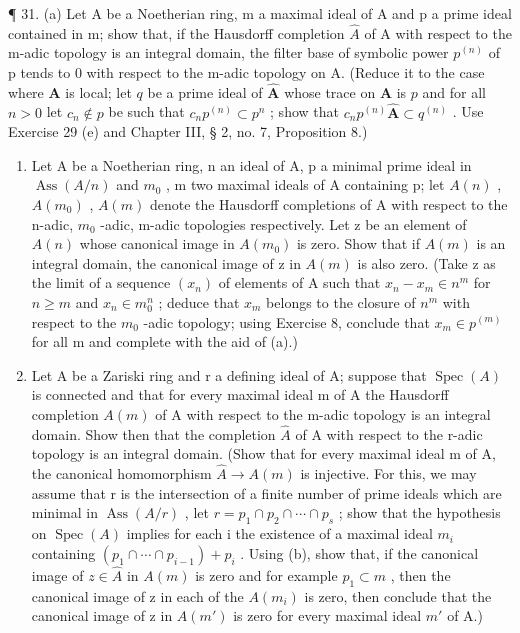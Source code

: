 ¶ 31. (a) Let A be a Noetherian ring, m a maximal ideal of A and p a prime ideal contained in m; show that, if the Hausdorff completion \(\hat{A}\) of A with respect to the m-adic topology is an integral domain, the filter base of symbolic power \(p^{(n)}\) of p tends to 0 with respect to the m-adic topology on A. (Reduce it to the case where \(\mathbf{A}\) is local; let \(q\) be a prime ideal of \(\hat{\mathbf{A}}\) whose trace on \(\mathbf{A}\) is \(p\) and for all \(n > 0\) let \(c_{n} \notin p\) be such that \(c_{n} p^{(n)} \subset p^{n}\) ; show that \(c_{n} p^{(n)} \hat{\mathbf{A}} \subset q^{(n)}\) . Use Exercise 29 (e) and Chapter III, § 2, no. 7, Proposition 8.)

\begin{enumerate}
\def\labelenumi{(\alph{enumi})}
\setcounter{enumi}{1}
\item
  Let A be a Noetherian ring, n an ideal of A, p a minimal prime ideal in \(\operatorname{Ass}(A/n)\) and \(m_{0}\) , m two maximal ideals of A containing p; let \(A(n)\) , \(A(m_{0})\) , \(A(m)\) denote the Hausdorff completions of A with respect to the n-adic, \(m_{0}\) -adic, m-adic topologies respectively. Let z be an element of \(A(n)\) whose canonical image in \(A(m_{0})\) is zero. Show that if \(A(m)\) is an integral domain, the canonical image of z in \(A(m)\) is also zero. (Take z as the limit of a sequence \((x_{n})\) of elements of A such that \(x_{n}-x_{m}\in n^{m}\) for \(n\geqslant m\) and \(x_{n}\in m_{0}^{n}\) ; deduce that \(x_{m}\) belongs to the closure of \(n^{m}\) with respect to the \(m_{0}\) -adic topology; using Exercise 8, conclude that \(x_{m}\in p^{(m)}\) for all m and complete with the aid of (a).)
\item
  Let A be a Zariski ring and r a defining ideal of A; suppose that \(\operatorname{Spec}(A)\) is connected and that for every maximal ideal m of A the Hausdorff completion \(A(m)\) of A with respect to the m-adic topology is an integral domain. Show then that the completion \(\hat{A}\) of A with respect to the r-adic topology is an integral domain. (Show that for every maximal ideal m of A, the canonical homomorphism \(\hat{A} \to A(m)\) is injective. For this, we may assume that r is the intersection of a finite number of prime ideals which are minimal in \(\operatorname{Ass}(A/r)\) , let \(r = p_{1} \cap p_{2} \cap \cdots \cap p_{s}\) ; show that the hypothesis on \(\operatorname{Spec}(A)\) implies for each i the existence of a maximal ideal \(m_{i}\) containing \((p_{1} \cap \cdots \cap p_{i-1}) + p_{i}\) . Using (b), show that, if the canonical image of \(z \in \hat{A}\) in \(A(m)\) is zero and for example \(p_{1} \subset m\) , then the canonical image of z in each of the \(A(m_{i})\) is zero, then conclude that the canonical image of z in \(A(m')\) is zero for every maximal ideal \(m'\) of A.)
\end{enumerate}

